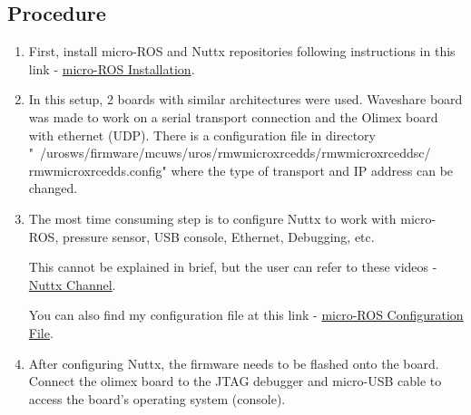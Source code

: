 \documentclass[%
xelatex,
	oneside,		%
	12pt,			%
	parskip=half,	%
	abstracton,
	chapterprefix=true%
    appendixprefix=true]
{scrbook}
\begin{document}
	\subsection{Procedure}	
	\vspace*{0.5cm}
	\begin{enumerate}
	\item First, install micro-ROS and Nuttx repositories following instructions in this link - \href{https://micro-ros.github.io/docs/tutorials/basic/getting_started/}{micro-ROS Installation}\cite{urosinstall}.
	\item In this setup, 2 boards with similar architectures were used. Waveshare board was made to work on a serial transport connection and the Olimex board with ethernet (UDP). There is a configuration file in directory "~/uros\textunderscore ws/firmware/mcu\textunderscore ws/uros/rmw\textunderscore microxrcedds/rmw\textunderscore microxrcedds\textunderscore c/\linebreak
	rmw\textunderscore microxrcedds.config" where the type of transport and IP address can be changed.
	\item The most time consuming step is to configure Nuttx to work with micro-ROS, pressure sensor, USB console, Ethernet, Debugging, etc. 
	
	This cannot be explained in brief, but the user can refer to these videos - \href{https://www.youtube.com/channel/UC0QciIlcUnjJkL5yJJBmluw/videos}{Nuttx Channel}\cite{Nuttxchannel}. 
	
	You can also find my configuration file at this link - \href{https://github.com/Viplav04/NuttX/tree/master/configs/olimex-stm32-e407/uros}{micro-ROS Configuration File}\cite{olimexconfigfile}.
	\item After configuring Nuttx, the firmware needs to be flashed onto the board. Connect the olimex board to the JTAG debugger and micro-USB cable to access the board's operating system (console). 
	

\end{enumerate}
\end{document}
